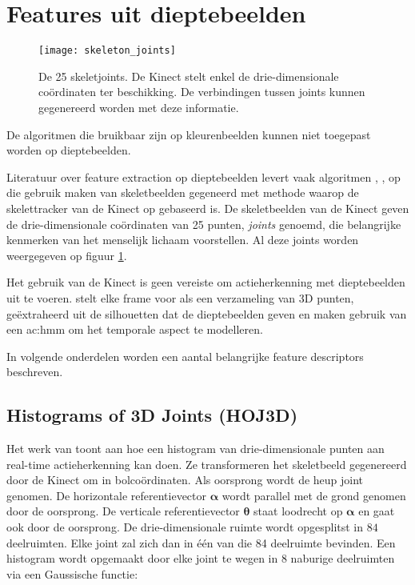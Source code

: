 \section{Features uit dieptebeelden}
\begin{figure}
	\centering
	\texttt{[image: skeleton\_joints]}
	\caption{De 25 skeletjoints. De Kinect stelt enkel de drie-dimensionale coördinaten ter beschikking. De verbindingen tussen joints kunnen gegenereerd worden met deze informatie.}
	\label{fig:skeleton_joints}
\end{figure}
De algoritmen die bruikbaar zijn op kleurenbeelden kunnen niet toegepast worden op dieptebeelden. 



Literatuur over feature extraction op dieptebeelden levert vaak algoritmen \cite{Xia2012}, \cite{Wang2012b}, \cite{Yang2012} op die gebruik maken van skeletbeelden gegeneerd met methode \cite{Shotton2011} waarop de skelettracker van de Kinect op gebaseerd is. De skeletbeelden van de Kinect geven de drie-dimensionale coördinaten van 25 punten, \textit{joints} genoemd, die belangrijke kenmerken van het menselijk lichaam voorstellen. Al deze joints worden weergegeven op figuur \ref{fig:skeleton_joints}.

Het gebruik van de Kinect is geen vereiste om actieherkenning met dieptebeelden uit te voeren. \cite{Li2010} stelt elke frame voor als een verzameling van 3D punten, geëxtraheerd uit de silhouetten dat de dieptebeelden geven en maken gebruik van een \gls{ac:hmm} om het temporale aspect te modelleren. \cite{Wang2012a} 

In volgende onderdelen worden een aantal belangrijke feature descriptors beschreven.
\subsection{Histograms of 3D Joints (HOJ3D)}
Het werk van \cite{Xia2012} toont aan hoe een histogram van drie-dimensionale punten aan real-time actieherkenning kan doen. Ze transformeren het skeletbeeld gegenereerd door de Kinect om in bolcoördinaten. Als oorsprong wordt de heup joint genomen. De horizontale referentievector $\mathbf{\alpha}$ wordt parallel met de grond genomen door de oorsprong. De verticale referentievector $\mathbf{\theta}$ staat loodrecht op $\mathbf{\alpha}$ en gaat ook door de oorsprong. De drie-dimensionale ruimte wordt opgesplitst in $84$ deelruimten. Elke joint zal zich dan in één van die 84 deelruimte bevinden. Een histogram wordt opgemaakt door elke joint te wegen in 8 naburige deelruimten via een Gaussische functie:

